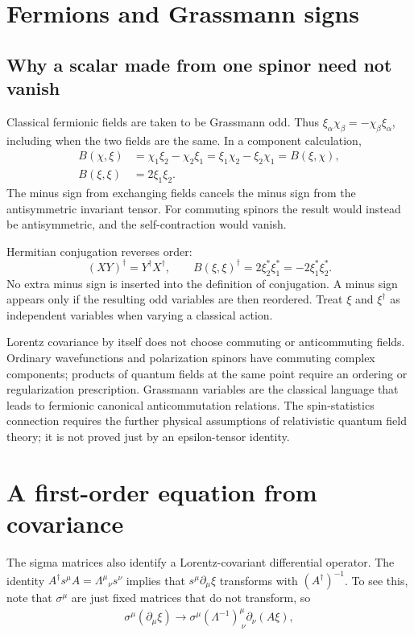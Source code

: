 \documentclass[11pt]{article}
\begin{document}
\section{Fermions and Grassmann signs}
\subsection{Why a scalar made from one spinor need not vanish}
Classical fermionic fields are taken to be Grassmann odd. Thus
\(\xi_\alpha\chi_\beta=-\chi_\beta\xi_\alpha\), including when
the two fields are the same. In a component calculation,
\begin{align}
 B(\chi,\xi)&=\chi_1\xi_2-\chi_2\xi_1
             =\xi_1\chi_2-\xi_2\chi_1=B(\xi,\chi),
             \label{eq:Bsym}\\
 B(\xi,\xi)&=2\xi_1\xi_2.\label{eq:selfB}
\end{align}
The minus sign from exchanging fields cancels the minus sign from
the antisymmetric invariant tensor. For commuting spinors the result
would instead be antisymmetric, and the self-contraction would vanish.

Hermitian conjugation reverses order:
\begin{equation}
 (XY)^\dagger=Y^\dagger X^\dagger,\qquad
 B(\xi,\xi)^\dagger=2\xi_2^*\xi_1^*
                         =-2\xi_1^*\xi_2^*.
 \label{eq:daggerB}
\end{equation}
No extra minus sign is inserted into the definition of conjugation.
A minus sign appears only if the resulting odd variables are then
reordered. Treat \(\xi\) and \(\xi^\dagger\) as independent variables
when varying a classical action.

\begin{remarkbox}
Lorentz covariance by itself does not choose commuting or
anticommuting fields. Ordinary wavefunctions and polarization spinors
have commuting complex components; products of quantum fields at the
same point require an ordering or regularization prescription. Grassmann variables are the classical language
that leads to fermionic canonical anticommutation relations. The
spin-statistics connection requires the further physical assumptions
of relativistic quantum field theory; it is not proved just by an
epsilon-tensor identity.
\end{remarkbox}


\section{A first-order equation from covariance}
The sigma matrices also identify a Lorentz-covariant differential
operator. The identity \(A^\dagger s^\mu A=\Lambda^\mu{}_{\nu}s^\nu\)
implies that \(s^\mu\partial_\mu\xi\) transforms with
\((A^\dagger)^{-1}\). To see this, note that $\sigma^\mu$ are just fixed matrices that do not transform, so
\begin{align}
    \sigma^\mu(\partial_\mu\xi)\to \sigma^\mu(\Lambda^{-1})^\mu_{\:\nu}\partial_\nu(A\xi),
\end{align}
\end{document}
